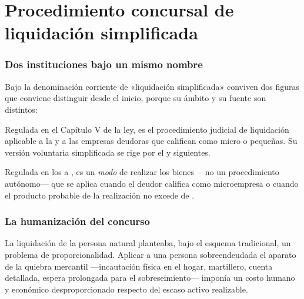 \chapter{Procedimiento concursal de liquidación simplificada}
\label{cap:liquidacion-simplificada}


\bloqueTeorico

\subsection{Dos instituciones bajo un mismo nombre}

Bajo la denominación corriente de «liquidación simplificada» conviven dos figuras que
conviene distinguir desde el inicio, porque su ámbito y su fuente son distintos:

\begin{description}[leftmargin=0pt,style=nextline,font=\sffamily\bfseries]
  \item[La liquidación de los bienes de la Persona Deudora] Regulada en el Capítulo V de la
  ley, es el procedimiento judicial de liquidación aplicable a la \personadeudora{} y a las
  empresas deudoras que califican como micro o pequeñas. Su versión voluntaria simplificada
  se rige por el  y siguientes.

  \item[La realización sumaria o simplificada del activo] Regulada en los  a
  , es un \emph{modo} de realizar los bienes ---no un procedimiento autónomo---
  que se aplica cuando el deudor califica como microempresa o cuando el producto probable
  de la realización no excede de .
\end{description}

\subsection{La humanización del concurso}

La liquidación de la persona natural planteaba, bajo el esquema tradicional, un problema de
proporcionalidad. Aplicar a una persona sobreendeudada el aparato de la quiebra mercantil
---incautación física en el hogar, martillero, cuenta detallada, espera prolongada para el
sobreseimiento--- imponía un costo humano y económico desproporcionado respecto del escaso
activo realizable.

